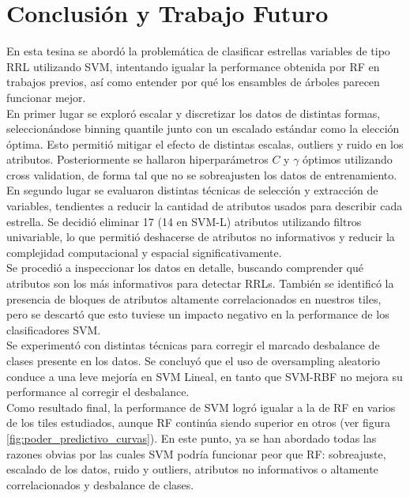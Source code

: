 \chapter{Conclusión y Trabajo Futuro}

En esta tesina se abordó la problemática de clasificar estrellas variables de tipo RRL utilizando SVM, intentando igualar la performance obtenida por RF en trabajos previos, así como entender por qué los ensambles de árboles parecen funcionar mejor. \\

En primer lugar se exploró escalar y discretizar los datos de distintas formas, seleccionándose binning quantile junto con un escalado estándar como la elección óptima. Esto permitió mitigar el efecto de distintas escalas, outliers y ruido en los atributos. Posteriormente se hallaron hiperparámetros $C$ y $\gamma$ óptimos utilizando cross validation, de forma tal que no se sobreajusten los datos de entrenamiento. \\

En segundo lugar se evaluaron distintas técnicas de selección y extracción de variables, tendientes a reducir la cantidad de atributos usados para describir cada estrella. Se decidió eliminar 17 (14 en SVM-L) atributos utilizando filtros univariable, lo que permitió deshacerse de atributos no informativos y reducir la complejidad computacional y espacial significativamente. \\

Se procedió a inspeccionar los datos en detalle, buscando comprender qué atributos son los más informativos para detectar RRLs. También se identificó la presencia de bloques de atributos altamente correlacionados en nuestros tiles, pero se descartó que esto tuviese un impacto negativo en la performance de los clasificadores SVM. \\

Se experimentó con distintas técnicas para corregir el marcado desbalance de clases presente en los datos. Se concluyó que el uso de oversampling aleatorio conduce a una leve mejoría en SVM Lineal, en tanto que SVM-RBF no mejora su performance al corregir el desbalance. \\

Como resultado final, la performance de SVM logró igualar a la de RF en varios de los tiles estudiados, aunque RF continúa siendo superior en otros (ver figura \ref{fig:poder_predictivo_curvas}). En este punto, ya se han abordado todas las razones obvias por las cuales SVM podría funcionar peor que RF: sobreajuste, escalado de los datos, ruido y outliers, atributos no informativos o altamente correlacionados y desbalance de clases. \\

